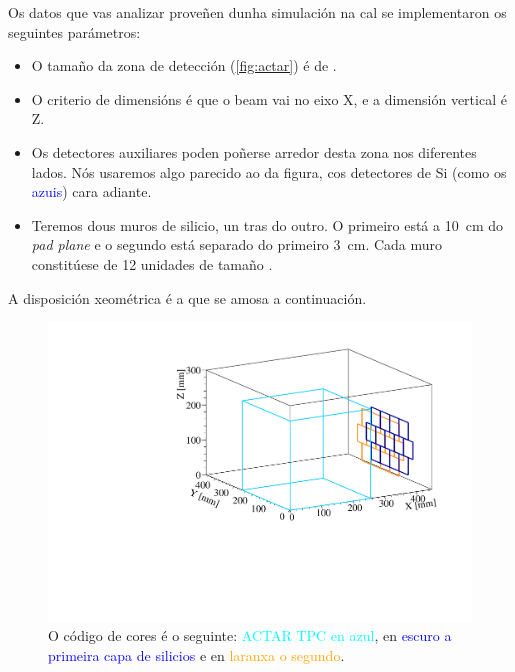 \documentclass[11pt, a4paper]{article}
\begin{document}
Os datos que vas analizar proveñen dunha simulación na cal se implementaron os seguintes parámetros:
\begin{itemize}
    \item O tamaño da zona de detección (\autoref{fig:actar}) é de .
    \item O criterio de dimensións é que o beam vai no eixo X, e a dimensión vertical é Z.
    \item Os detectores auxiliares poden poñerse arredor desta zona nos diferentes lados. Nós usaremos algo parecido ao da figura, cos detectores de Si (como os \textcolor{blue}{azuis}) cara adiante.
    \item Teremos dous muros de silicio, un tras do outro. O primeiro está a \qty{10}{\cm} do \textit{pad plane} e o segundo está separado do primeiro \qty{3}{\cm}. Cada muro constitúese de 12 unidades de tamaño .
\end{itemize}

A disposición xeométrica é a que se amosa a continuación.
\begin{figure}[!htb]
    \centering
    \includegraphics[width=0.7\linewidth]{figures/geo.pdf}
    \caption{O código de cores é o seguinte: \textcolor{Cyan}{ACTAR TPC en azul}, en \textcolor{Blue}{escuro a primeira capa de silicios} e en \textcolor{orange}{laranxa o segundo}.}
\end{figure}
\end{document}
